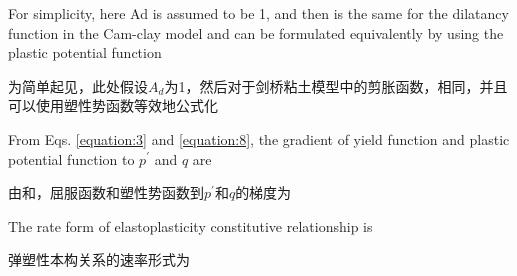 \begin{ParaColumn}
    \switchcolumn*

    For simplicity, here Ad is assumed to be 1, and then  is the same for the dilatancy function in the Cam-clay model and can be formulated equivalently by using the plastic potential function

    \switchcolumn

    为简单起见，此处假设$A_d$为1，然后对于剑桥粘土模型中的剪胀函数，相同，并且可以使用塑性势函数等效地公式化

    \switchcolumn*

    \noindent
    From Eqs. \ref{equation:3} and \ref{equation:8}, the gradient of yield function and plastic potential function to $p^\prime$ and $q$ are

    \switchcolumn

    \noindent
    由和，屈服函数和塑性势函数到$p^\prime$和$q$的梯度为

    \switchcolumn*

    The rate form of elastoplasticity constitutive relationship is

    \switchcolumn

    弹塑性本构关系的速率形式为

    \switchcolumn*


\end{ParaColumn}
